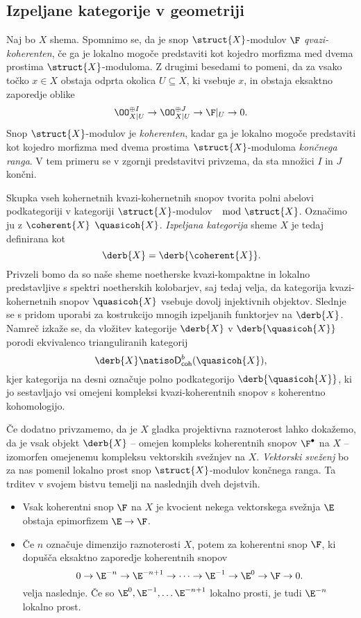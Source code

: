 \subsection*{Izpeljane kategorije v geometriji}

Naj bo $X$ shema. Spomnimo se, da je snop $\struct{X}$-modulov $\F$ \emph{qvazi-koherenten}, če ga je lokalno mogoče predstaviti kot kojedro morfizma med dvema prostima $\struct{X}$-moduloma. Z drugimi besedami to pomeni, da za vsako točko $x \in X$ obstaja odprta okolica $U \subseteq X$, ki vsebuje $x$, in obstaja eksaktno zaporedje oblike 
\[
    \OO_{X|U}^{\oplus I} \to \OO_{X|U}^{\oplus J} \to \F|_U \to 0.
\]
Snop $\struct{X}$-modulov je \emph{koherenten}, kadar ga je lokalno mogoče predstaviti kot kojedro morfizma med dvema prostima $\struct{X}$-moduloma \emph{končnega ranga}. V tem primeru se v zgornji predstavitvi privzema, da sta množici $I$ in $J$ končni.  

Skupka vseh kohernetnih \oz kvazi-kohernetnih snopov tvorita polni abelovi podkategoriji v kategoriji $\struct{X}$-modulov $\mod{\struct{X}}$. Označimo ju z $\coherent{X}$ \oz $\quasicoh{X}$. \emph{Izpeljana kategorija} sheme $X$ je tedaj definirana kot
\[
    \derb{X} = \derb{\coherent{X}}.
\]   
Privzeli bomo da so naše sheme noetherske \tj kvazi-kompaktne in lokalno predstavljive s spektri noetherskih kolobarjev, saj tedaj velja, da kategorija kvazi-kohernetnih snopov $\quasicoh{X}$ vsebuje dovolj injektivnih objektov. Slednje se s pridom uporabi za kostrukcijo mnogih izpeljanih funktorjev na $\derb{X}$. Namreč izkaže se, da vložitev kategorije $\derb{X}$ v $\derb{\quasicoh{X}}$ porodi ekvivalenco trianguliranih kategorij 
\[
    \derb{X} \natiso \mathsf{D}^b_{\mathsf{coh}}(\quasicoh{X}),
\]
kjer kategorija na desni označuje polno podkategorijo $\derb{\quasicoh{X}}$, ki jo sestavljajo vsi omejeni kompleksi kvazi-koherentnih snopov s koherentno kohomologijo. 

Če dodatno privzamemo, da je $X$ gladka projektivna raznoterost lahko dokažemo, da je vsak objekt $\derb{X}$ -- \tj omejen kompleks koherentnih snopov $\F^\bullet$ na $X$ -- izomorfen omejenemu kompleksu vektorskih svežnjev na $X$. \emph{Vektorski sveženj} bo za nas pomenil lokalno prost snop $\struct{X}$-modulov končnega ranga. Ta trditev v svojem bistvu temelji na naslednjih dveh dejstvih. 

\begin{itemize}[label = $\rhd$]
    \item Vsak koherentni snop $\F$ na $X$ je kvocient nekega vektorskega svežnja $\E$ \tj obstaja epimorfizem $\E \to \F$.
    \item Če $n$ označuje dimenzijo raznoterosti $X$, potem za koherentni snop $\F$, ki dopušča eksaktno zaporedje koherentnih snopov 
    \[
        0 \to \E^{-n} \to \E^{-n+1} \to \cdots \to \E^{-1} \to \E^0 \to \F \to 0.
    \]  
    velja naslednje. Če so $\E^0, \E^{-1}, \dots \E^{-n+1}$ lokalno prosti, je tudi $\E^{-n}$ lokalno prost. 
\end{itemize}

